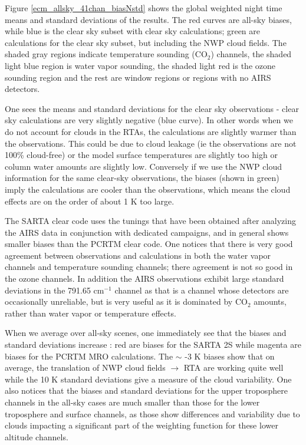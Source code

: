 \documentclass[agupp]{aguplus}              %
\newcommand{\wn}{cm$^{-1}$\xspace}
\newcommand{\cd}{CO$_2$\xspace}
\begin{document}
\begin{article}
Figure \ref{ecm_allsky_41chan_biasNstd} shows the global weighted
night time means and standard
deviations of the results. The red curves are all-sky biases, while blue
is the clear sky subset with clear sky calculations; green are
calculations for the clear sky subset, but including the NWP cloud
fields. The shaded gray regions indicate temperature sounding (\cd)
channels, the shaded light blue region is water vapor sounding, the
shaded light red is the ozone sounding region and the rest are window
regions or regions with no AIRS detectors. 

One sees the means and standard deviations for the clear sky
observations - clear sky calculations are very slightly negative (blue
curve). In other words when we do not account for clouds in the RTAs,
the calculations are slightly warmer than the observations. This could
be due to cloud leakage (ie the observations are not 100\% cloud-free)
or the model surface temperatures are slightly too high or column
water amounts are slightly low.  Conversely if we use the NWP cloud
information for the same clear-sky observations, the biases (shown in
green) imply the calculations are cooler than the observations, which
means the cloud effects are on the order of about 1 K too large.

The SARTA clear code uses the tunings that have been obtained after
analyzing the AIRS data in conjunction with dedicated campaigns, and
in general shows smaller biases than the PCRTM clear code. One notices
that there is very good agreement between observations and
calculations in both the water vapor channels and temperature sounding
channels; there agreement is not so good in the ozone channels. In
addition the AIRS observations exhibit large standard deviations in
the 791.65 \wn channel as that is a channel whose detectors are
occasionally unreliable, but is very useful as it is dominated by \cd
amounts, rather than water vapor or temperature effects.

When we average over all-sky scenes, one immediately see that the
biases and standard deviations increase : red are biases for the SARTA
2S while magenta are biases for the PCRTM MRO calculations. The $\sim$
-3 K biases show that on average, the translation of NWP cloud fields
$\rightarrow$ RTA are working quite well while the 10 K standard
deviations give a measure of the cloud variability. One also notices
that the biases and standard deviations for the upper troposphere
channels in the all-sky cases are much smaller than those for the
lower troposphere and surface channels, as those show differences
and variability due to clouds impacting a significant part of the
weighting function for these lower altitude channels.


\end{article}
\end{document}
